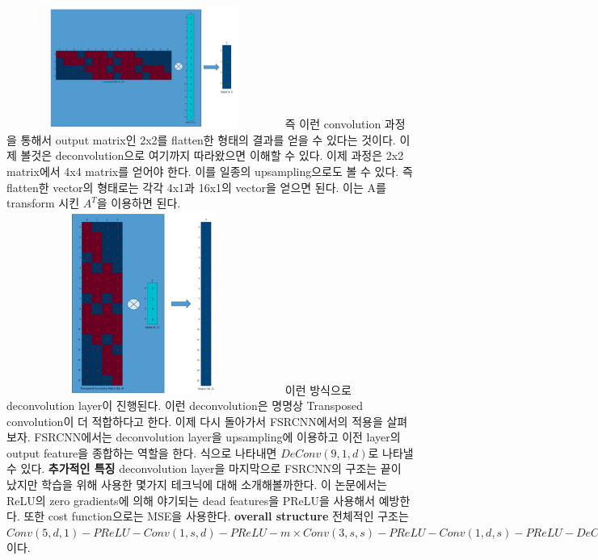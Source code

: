 \documentclass[extendedabs]{bmvc2k}
\begin{document}
 \newline  \includegraphics[width=9cm, height=4cm]{images/05_SR.PNG}
 \newline 즉 이런 convolution 과정을 통해서 output matrix인 2x2를 flatten한 형태의 결과를 얻을 수 있다는 것이다.
 이제 볼것은 deconvolution으로 여기까지 따라왔으면 이해할 수 있다. 이제 과정은 2x2 matrix에서 4x4 matrix를 얻어야 한다. 이를 일종의 upsampling으로도 볼 수 있다. 
 즉 flatten한 vector의 형태로는 각각 4x1과 16x1의 vector을 얻으면 된다. 이는 A를 transform 시킨 $A^T$을 이용하면 된다.
 \newline  \includegraphics[width=9cm, height=6cm]{images/06_SR.PNG}
 \newline 이런 방식으로 deconvolution layer이 진행된다. 이런 deconvolution은 명명상 Transposed convolution이 더 적합하다고 한다.
 \newline 이제 다시 돌아가서 FSRCNN에서의 적용을 살펴보자. FSRCNN에서는 deconvolution layer을 upsampling에 이용하고 이전 layer의 output feature을 종합하는 역할을 한다.
 식으로 나타내면 $ DeConv(9,1,d) $로 나타낼 수 있다. 
 \newline \quad \textbf{추가적인 특징} deconvolution layer을 마지막으로 FSRCNN의 구조는 끝이 났지만 학습을 위해 사용한 몇가지 테크닉에 대해 소개해볼까한다.
 이 논문에서는 ReLU의 zero gradients에 의해 야기되는 dead features을 PReLU을 사용해서 예방한다. 또한 cost function으로는 MSE을 사용한다.
 \newline \quad \textbf{overall structure}
 전체적인 구조는 $ Conv(5,d,1) - PReLU - Conv(1,s,d) - PReLU - m \times Conv(3,s,s) - PReLU - Conv(1,d,s) - PReLU - DeConv(9,1,d) $ 이다.
\end{document}
